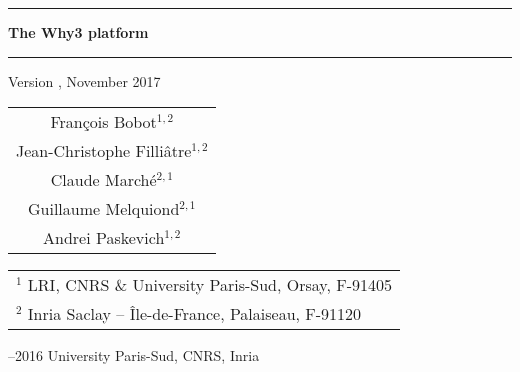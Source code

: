 \documentclass[a4paper,11pt,twoside,openright]{memoir}
\begin{document}
\sloppy

\thispagestyle{empty}

\begin{center}

\rule\textwidth{0.8mm}

\vfill

{
\fontsize{40}{40pt}\selectfont
\bfseries\sffamily The Why3 platform}

\vfill

\rule\textwidth{0.8mm}

\vfill


\begin{LARGE}
  Version \whyversion{}, November 2017
\end{LARGE}

\vfill

\begin{Large}
  \begin{tabular}{c}
  Fran\c{c}ois Bobot$^{1,2}$ \\
  Jean-Christophe Filli\^atre$^{1,2}$  \\
  Claude March\'e$^{2,1}$ \\
  Guillaume Melquiond$^{2,1}$\\
  Andrei Paskevich$^{1,2}$
\end{tabular}
\end{Large}
\vfill

\begin{flushleft}

\begin{tabular}{l}
$^1$ LRI, CNRS \& University Paris-Sud, Orsay, F-91405 \\
$^2$ Inria Saclay -- \^Ile-de-France, Palaiseau, F-91120
\end{tabular}

\bigskip

--2016 University Paris-Sud, CNRS, Inria



\end{flushleft}
\end{center}
\end{document}
